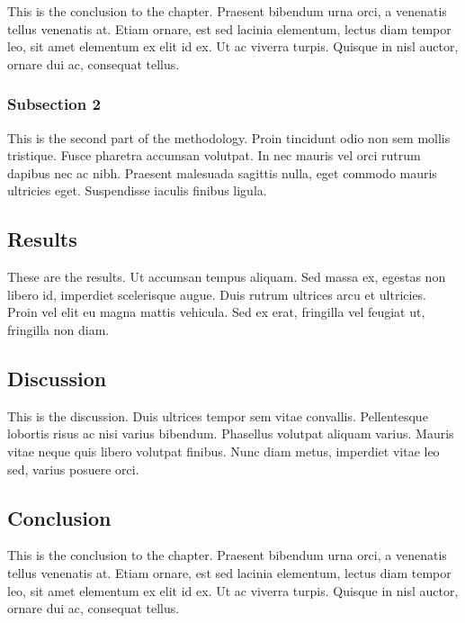 This is the conclusion to the chapter. Praesent bibendum urna orci,
a venenatis tellus venenatis at. Etiam ornare, est sed lacinia
elementum, lectus diam tempor leo, sit amet elementum ex elit id ex.
Ut ac viverra turpis. Quisque in nisl auctor, ornare dui ac,
consequat tellus.

\hypertarget{subsection-2}{%
\subsubsection{Subsection 2}\label{subsection-2}}

This is the second part of the methodology. Proin tincidunt odio non
sem mollis tristique. Fusce pharetra accumsan volutpat. In nec
mauris vel orci rutrum dapibus nec ac nibh. Praesent malesuada
sagittis nulla, eget commodo mauris ultricies eget. Suspendisse
iaculis finibus ligula.

\hypertarget{results}{%
\subsection{Results}\label{results}}

These are the results. Ut accumsan tempus aliquam. Sed massa ex,
egestas non libero id, imperdiet scelerisque augue. Duis rutrum
ultrices arcu et ultricies. Proin vel elit eu magna mattis vehicula.
Sed ex erat, fringilla vel feugiat ut, fringilla non diam.

\hypertarget{discussion}{%
\subsection{Discussion}\label{discussion}}

This is the discussion. Duis ultrices tempor sem vitae convallis.
Pellentesque lobortis risus ac nisi varius bibendum. Phasellus
volutpat aliquam varius. Mauris vitae neque quis libero volutpat
finibus. Nunc diam metus, imperdiet vitae leo sed, varius posuere
orci.

\hypertarget{conclusion}{%
\subsection{Conclusion}\label{conclusion}}

This is the conclusion to the chapter. Praesent bibendum urna orci,
a venenatis tellus venenatis at. Etiam ornare, est sed lacinia
elementum, lectus diam tempor leo, sit amet elementum ex elit id ex.
Ut ac viverra turpis. Quisque in nisl auctor, ornare dui ac,
consequat tellus.

